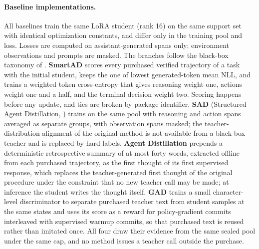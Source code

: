 \paragraph{Baseline implementations.}\label{app:baselines}
All baselines train the same LoRA student (rank 16) on the same
support set with identical optimization constants, and differ only in
the training pool and loss. Losses are computed on assistant-generated
spans only; environment observations and prompts are masked. The
branches follow the black-box taxonomy of \citet{xu2024kdsurvey}.
\textbf{SmartAD} scores every purchased verified trajectory of a task
with the initial student, keeps the one of lowest generated-token mean
NLL, and trains a weighted token cross-entropy that gives reasoning
weight one, actions weight one and a half, and the terminal decision
weight two. Scoring happens before any update, and ties are broken by
package identifier. \textbf{SAD} (Structured Agent Distillation,
\citealp{liu2025structured}) trains on the same pool with reasoning
and action spans averaged as separate groups, with observation spans
masked; the teacher-distribution alignment of the original method is
not available from a black-box teacher and is replaced by hard
labels. \textbf{Agent Distillation} \citep{kang2025distilling}
prepends a deterministic retrospective summary of at most forty words,
extracted offline from each purchased trajectory, as the first thought
of its first supervised response, which replaces the teacher-generated
first thought of the original procedure under the constraint that no
new teacher call may be made; at inference the student writes the
thought itself. \textbf{GAD} \citep{ye2025bbopd} trains a small
character-level discriminator to separate purchased teacher text from
student samples at the same states and uses its score as a reward for
policy-gradient commits interleaved with supervised warmup commits, so
that purchased text is reused rather than imitated once. All four draw
their evidence from the same sealed pool under the same cap, and no
method issues a teacher call outside the purchase.

